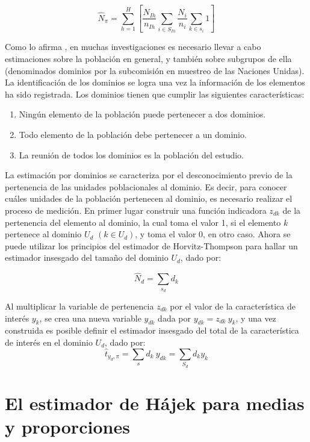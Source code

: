\documentclass[
  12pt,
]{book}
\providecommand{\tightlist}{%
  \setlength{\itemsep}{0pt}\setlength{\parskip}{0pt}}
\begin{document}
\[
\hat{N}_{\pi}=\sum_{h=1}^H\left[\frac{N_{Ih}}{n_{Ih}}\sum_{i\in S_{Ih}}\frac{N_i}{n_i}\sum_{k\in s_i}1\right]
\]

Como lo afirma \citet{Gutierrez_2016}, en muchas investigaciones es necesario llevar a cabo estimaciones sobre la población en general, y también sobre subgrupos de ella (denominados dominios por la subcomisión en muestreo de las Naciones Unidas). La identificación de los dominios se logra una vez la información de los elementos ha sido registrada. Los dominios tienen que cumplir las siguientes características:

\begin{enumerate}
\def\labelenumi{\arabic{enumi}.}
\tightlist
\item
  Ningún elemento de la población puede pertenecer a dos dominios.
\item
  Todo elemento de la población debe pertenecer a un dominio.
\item
  La reunión de todos los dominios es la población del estudio.
\end{enumerate}

La estimación por dominios se caracteriza por el desconocimiento previo de la pertenencia de las unidades poblacionales al dominio. Es decir, para conocer cuáles unidades de la población pertenecen al dominio, es necesario realizar el proceso de medición. En primer lugar construir una función indicadora \(z_{dk}\) de la pertenencia del elemento al dominio, la cual toma el valor 1, si el elemento \(k\) pertenece al dominio \(U_d\) \((k\in U_d)\), y toma el valor 0, en otro caso. Ahora se puede utilizar los principios del estimador de Horvitz-Thompson para hallar un estimador insesgado del tamaño del dominio \(U_d\), dado por:

\[
\hat{N}_d = \sum_{s_d} d_k 
\]

Al multiplicar la variable de pertenencia \(z_{dk}\) por el valor de la característica de interés \(y_k\), se crea una nueva variable \(y_{dk}\) dada por \(y_{dk}=z_{dk} \ y_k\), y una vez construida es posible definir el estimador insesgado del total de la característica de interés en el dominio \(U_d\), dado por:
\[
\hat{t}_{y_d,\pi}=\sum_sd_k\ y_{dk}=\sum_{S_d}d_ky_k
\]

\hypertarget{el-estimador-de-huxe1jek-para-medias-y-proporciones}{%
\section{El estimador de Hájek para medias y proporciones}\label{el-estimador-de-huxe1jek-para-medias-y-proporciones}}
\end{document}
